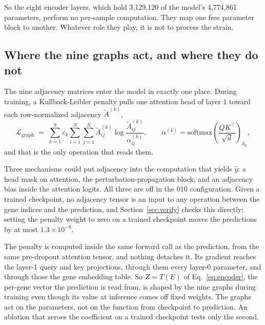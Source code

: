So the eight encoder layers, which hold 3{,}129{,}120 of the model's 4{,}774{,}861
parameters, perform no per-sample computation. They map one free parameter block
to another. Whatever role they play, it is not to process the strain.

\subsection{Where the nine graphs act, and where they do not}
\label{sec:graphs}

The nine adjacency matrices enter the model in exactly one place. During
training, a Kullback-Leibler penalty pulls one attention head of layer 1 toward
each row-normalized adjacency $\tilde{A}^{(k)}$,
%
\begin{equation}
  \mathcal{L}_{\mathrm{graph}} \;=\; \sum_{k=1}^{9} c_k
  \sum_{i=1}^{N} \sum_{j=1}^{N}
  \tilde{A}^{(k)}_{ij} \log \frac{\tilde{A}^{(k)}_{ij}}{\alpha^{(k)}_{ij}},
  \qquad
  \alpha^{(k)} = \mathrm{softmax}\!\left(\frac{QK^{\top}}{\sqrt{d}}\right)_{\!h_k},
  \label{eq:graphreg}
\end{equation}
%
and that is the only operation that reads them.

Three mechanisms could put adjacency into the computation that yields
$\hat{y}$: a head mask on attention, the perturbation-propagation block, and an
adjacency bias inside the attention logits. All three are off in the 010
configuration. Given a trained checkpoint, no adjacency tensor is an input to any
operation between the gene indices and the prediction, and
Section~\ref{sec:verify} checks this directly: setting the penalty weight to zero
on a trained checkpoint moves the predictions by at most $1.3 \times 10^{-6}$.

The penalty is computed inside the same forward call as the prediction, from the
same pre-dropout attention tensor, and nothing detaches it. Its gradient reaches
the layer-1 query and key projections, through them every layer-0 parameter,
and through those the gene embedding table. So $Z = T(E)$ of
Eq.~\ref{eq:encoder}, the per-gene vector the prediction is read from, is shaped
by the nine graphs during training even though its value at inference comes off
fixed weights. The graphs act on the parameters, not on the function from
checkpoint to prediction. An ablation that zeroes the coefficient on a trained
checkpoint tests only the second.

